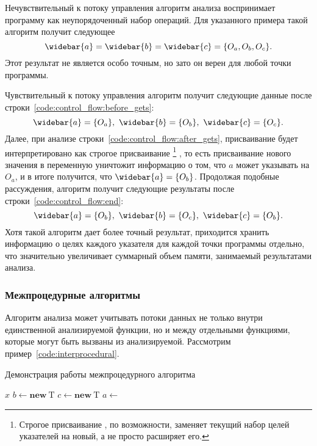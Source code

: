 \documentclass[14pt,titlepage,draft]{extarticle}
\newcommand{\type}[1]{\mathrm{#1}}
\newcommand{\op}[1]{\mathbf{#1}}
\newcommand{\pts}[1]{\widebar{#1}}
\begin{document}
        Нечувствительный к потоку управления алгоритм анализа воспринимает
        программу как неупорядоченный набор операций.
        Для указанного примера такой алгоритм получит следующее
        \[\pts{a} = \pts{b} = \pts{c} = \{O_a, O_b, O_c\}.\]
        Этот результат не является особо точным, но зато он верен
        для любой точки программы.

        Чувствительный к потоку управления алгоритм получит следующие данные
        после строки~\ref{code:control_flow:before_gets}:
        \[\pts{a} = \{O_a\},\ \pts{b} = \{O_b\},\ \pts{c} = \{O_c\}.\]
        Далее, при анализе строки~\ref{code:control_flow:after_gets},
        присваивание будет интерпретировано как строгое присваивание%
        \footnote{Строгое присваивание , по возможности,
        заменяет текущий набор целей указателей на новый, а не просто расширяет
        его.}%
        , то есть присваивание нового значения в переменную уничтожит
        информацию о том, что $a$ может указывать на $O_a$, и в итоге
        получится, что $\pts{a} = \{O_b\}$.
        Продолжая подобные рассуждения, алгоритм получит следующие результаты
        после строки~\ref{code:control_flow:end}:
        \[\pts{a} = \{O_b\},\ \pts{b} = \{O_c\},\ \pts{c} = \{O_b\}.\]
        Хотя такой алгоритм дает более точный результат, приходится хранить
        информацию о целях каждого указателя для каждой точки программы
        отдельно, что значительно увеличивает суммарный объем памяти,
        занимаемый результатами анализа.

      \subsubsection{Межпроцедурные алгоритмы}

        Алгоритм анализа может учитывать потоки данных не только внутри
        единственной анализируемой функции, но и между отдельными функциями,
        которые могут быть вызваны из анализируемой.
        Рассмотрим пример~\ref{code:interprocedural}.

        \begin{algorithm}
          \caption{Демонстрация работы межпроцедурного алгоритма}
          \label{code:interprocedural}
          \begin{algorithmic}[1]
              \State \Return $x$
            \EndFunction
            \Statex
            \State $b \gets \op{new}~\type{T}$
            \State $c \gets \op{new}~\type{T}$
            \State $a \gets$ 
          \end{algorithmic}
        \end{algorithm}
\end{document}
